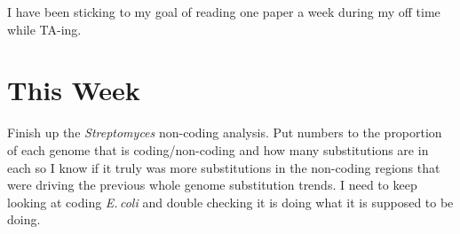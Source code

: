 \documentclass[12pt]{article}
\newcommand{\smel}{\textit{S.\,meliloti}\xspace}
\newcommand{\strep}{\textit{Streptomyces}\xspace}
\newcommand{\ecol}{\textit{E.\,coli}\xspace}
\newcommand{\pb}{pSymB\xspace}
\begin{document}
I have been sticking to my goal of reading one paper a week during my off time while TA-ing.





\section*{This Week}
Finish up the \strep non-coding analysis.
Put numbers to the proportion of each genome that is coding/non-coding and how many substitutions are in each so I know if it truly was more substitutions in the non-coding regions that were driving the previous whole genome substitution trends.
I need to keep looking at coding \ecol and double checking it is doing what it is supposed to be doing.
\end{document}
